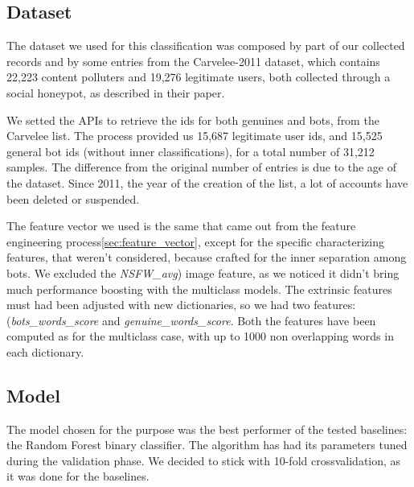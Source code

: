 \subsection{Dataset}
The dataset we used for this classification was composed by part of our collected records and by some entries from the Carvelee-2011 dataset, which contains 22,223 content polluters and 19,276 legitimate users, both collected through a social honeypot, as described in their paper\cite{Lee11sevenmonths}.

We setted the APIs to retrieve the ids for both genuines and bots, from the Carvelee list. The process provided us 15,687 legitimate user ids, and 15,525 general bot ids (without inner classifications), for a total number of 31,212 samples.
The difference from the original number of entries is due to the age of the dataset. Since 2011, the year of the creation of the list, a lot of accounts have been deleted or suspended.

The feature vector we used is the same that came out from the feature engineering process\ref{sec:feature_vector}, except for the specific characterizing features, that weren't considered, because crafted for the inner separation among bots. We excluded the \textit{NSFW\_avg}) image feature, as we noticed it didn't bring much performance boosting with the multiclass models.
The extrinsic features must had been adjusted with new dictionaries, so we had two features: (\textit{bots\_words\_score} and  \textit{genuine\_words\_score}.
Both the features have been computed as for the multiclass case, with up to 1000 non overlapping words in each dictionary.

\subsection{Model}
The model chosen for the purpose was the best performer of the tested baselines: the Random Forest binary classifier.
The algorithm has had its parameters tuned during the validation phase.
We decided to stick with 10-fold crossvalidation, as it was done for the baselines.

